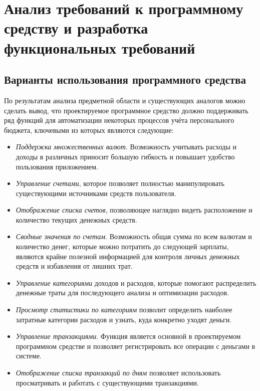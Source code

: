 \section{Анализ требований к программному средству и разработка функциональных требований}
\label{sec:domain}

\subsection{Варианты использования программного средства}
\label{sec:domain:use_cases}

По результатам анализа предметной области и существующих аналогов можно сделать вывод, что проектируемое программное средство должно поддерживать ряд функций для автоматизации некоторых процессов учёта персонального бюджета, ключевыми из которых являются следующие:

\begin{itemize}
    \item \emph{Поддержка множественных валют}.
    Возможность учитывать расходы и доходы в различных приносит большую гибкость и повышает удобство пользования приложением.
    \item \emph{Управление счетами}, которое позволяет полностью манипулировать существующими источниками средств пользователя.
    \item \emph{Отображение списка счетов}, позволяющее наглядно видеть расположение и количество текущих денежных средств.
    \item \emph{Сводные значения по счетам}.
    Возможность общая сумма по всем валютам и количество денег, которые можно потратить до следующей зарплаты, являются крайне полезной информацией для контроля личных денежных средств и избавления от лишних трат.
    \item \emph{Управление категориями} доходов и расходов, которые помогают распределить денежные траты для последующего анализа и оптимизации расходов.
    \item \emph{Просмотр статистики по категориям} позволит определить наиболее затратные категории расходов и узнать, куда конкретно уходят деньги.
    \item \emph{Управление транзакциями}.
    Функция является основной в проектируемом программном средстве и позволяет регистрировать все операции с деньгами в системе.
    \item \emph{Отображение списка транзакций по дням} позволяет использовать просматривать и работать с существующими транзакциями.
\end{itemize}

